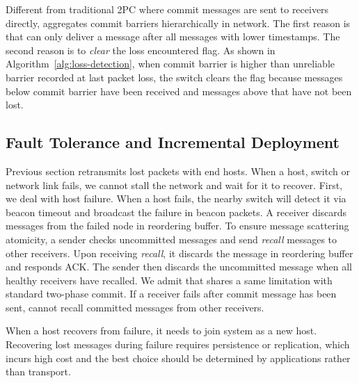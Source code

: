 
Different from traditional 2PC where commit messages are sent to receivers directly, \sys aggregates commit barriers hierarchically in network. The first reason is that \sys can only deliver a message after all messages with lower timestamps. The second reason is to \textit{clear} the loss encountered flag. As shown in Algorithm~\ref{alg:loss-detection}, when commit barrier is higher than unreliable barrier recorded at last packet loss, the switch clears the flag because messages below commit barrier have been received and messages above that have not been lost.


\subsection{Fault Tolerance and Incremental Deployment}
\label{sec:failure}

Previous section retransmits lost packets with end hosts. When a host, switch or network link fails, we cannot stall the network and wait for it to recover. First, we deal with host failure. When a host fails, the nearby switch will detect it via beacon timeout and broadcast the failure in beacon packets. A receiver discards messages from the failed node in reordering buffer. To ensure message scattering atomicity, a sender checks uncommitted messages and send \textit{recall} messages to other receivers. Upon receiving \textit{recall}, it discards the message in reordering buffer and responds ACK. The sender then discards the uncommitted message when all healthy receivers have recalled. We admit that \sys shares a same limitation with standard two-phase commit. If a receiver fails after commit message has been sent, \sys cannot recall committed messages from other receivers.

When a host recovers from failure, it needs to join \sys system as a new host. Recovering lost messages during failure requires persistence or replication, which incurs high cost and the best choice should be determined by applications rather than \sys transport.

